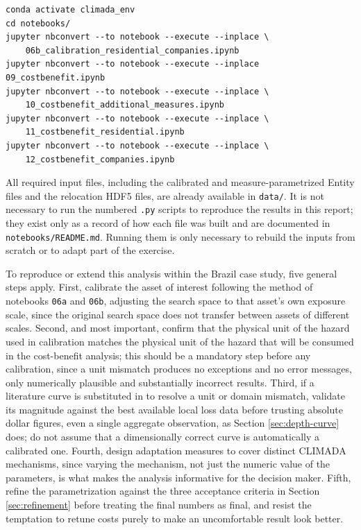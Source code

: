 \documentclass[11pt]{article}
\begin{document}
\begin{verbatim}
conda activate climada_env
cd notebooks/
jupyter nbconvert --to notebook --execute --inplace \
    06b_calibration_residential_companies.ipynb
jupyter nbconvert --to notebook --execute --inplace 09_costbenefit.ipynb
jupyter nbconvert --to notebook --execute --inplace \
    10_costbenefit_additional_measures.ipynb
jupyter nbconvert --to notebook --execute --inplace \
    11_costbenefit_residential.ipynb
jupyter nbconvert --to notebook --execute --inplace \
    12_costbenefit_companies.ipynb
\end{verbatim}

All required input files, including the calibrated and measure-parametrized Entity files
and the relocation HDF5 files, are already available in \texttt{data/}. It is not necessary
to run the numbered \texttt{.py} scripts to reproduce the results in this report; they
exist only as a record of how each file was built and are documented in
\texttt{notebooks/README.md}. Running them is only necessary to rebuild the inputs from
scratch or to adapt part of the exercise.

To reproduce or extend this analysis within the Brazil case study, five general steps
apply. First, calibrate the asset of interest following the method of notebooks
\texttt{06a} and \texttt{06b}, adjusting the search space to that asset's own exposure
scale, since the original search space does not transfer between assets of different
scales. Second, and most important, confirm that the physical unit of the hazard used in
calibration matches the physical unit of the hazard that will be consumed in the
cost-benefit analysis; this should be a mandatory step before any calibration, since a unit
mismatch produces no exceptions and no error messages, only numerically plausible and
substantially incorrect results. Third, if a literature curve is substituted in to resolve
a unit or domain mismatch, validate its magnitude against the best available local loss
data before trusting absolute dollar figures, even a single aggregate observation, as
Section \ref{sec:depth-curve} does; do not assume that a dimensionally correct curve is
automatically a calibrated one. Fourth, design adaptation measures to cover distinct
CLIMADA mechanisms, since varying the mechanism, not just the numeric value of the
parameters, is what makes the analysis informative for the decision maker. Fifth, refine the
parametrization against the three acceptance criteria in Section \ref{sec:refinement}
before treating the final numbers as final, and resist the temptation to retune costs
purely to make an uncomfortable result look better.
\end{document}
